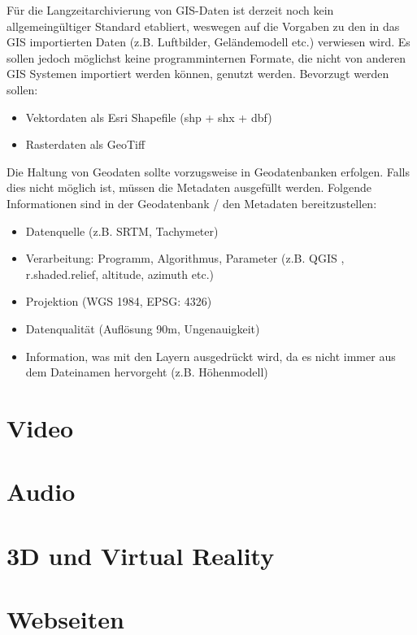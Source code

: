 Für die Langzeitarchivierung von GIS-Daten ist derzeit noch kein allgemeingültiger Standard etabliert, weswegen auf die Vorgaben zu den in das GIS importierten Daten (z.B. Luftbilder, Geländemodell etc.) verwiesen wird. Es sollen jedoch möglichst keine programminternen Formate, die nicht von anderen GIS Systemen importiert werden können, genutzt werden. Bevorzugt werden sollen:
\begin{itemize}
	\item Vektordaten als Esri Shapefile (shp + shx + dbf)
	\item Rasterdaten als GeoTiff
\end{itemize}

Die Haltung von Geodaten sollte vorzugsweise in Geodatenbanken erfolgen. Falls dies nicht möglich ist, müssen die Metadaten ausgefüllt werden. Folgende Informationen sind in der Geodatenbank / den Metadaten bereitzustellen:
\begin{itemize}
	\item Datenquelle (z.B. SRTM, Tachymeter)
	\item Verarbeitung: Programm, Algorithmus, Parameter (z.B. QGIS , r.shaded.relief, altitude, azimuth etc.)
	\item Projektion (WGS 1984, EPSG: 4326)
	\item Datenqualität (Auflösung 90m, Ungenauigkeit)
	\item Information, was mit den Layern ausgedrückt wird, da es nicht immer aus dem Dateinamen hervorgeht (z.B. Höhenmodell)
\end{itemize}
	

\newpage
\section{Video}\label{video}
	
	

\newpage
\section{Audio}\label{audio}
	
	

\newpage
\section{3D und Virtual Reality}\label{3D}
	
	

\newpage
\section{Webseiten}
	
	
	
